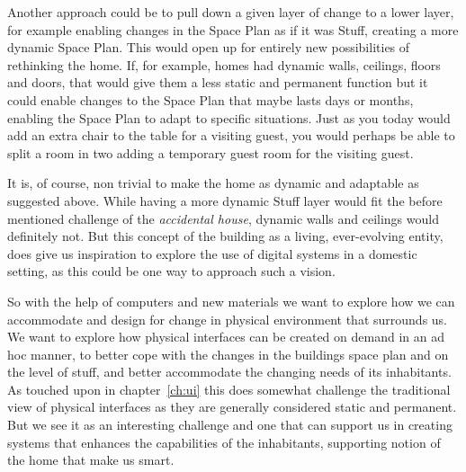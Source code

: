 Another approach could be to pull down a given layer of change to a lower layer, for example enabling changes in the Space Plan as if it was Stuff, creating a more dynamic Space Plan.
This would open up for entirely new possibilities of rethinking the home. 
If, for example, homes had dynamic walls, ceilings, floors and doors, that would give them a less static and permanent function but it could enable changes to the Space Plan that maybe lasts days or months, enabling the Space Plan to adapt to specific situations.
Just as you today would add an extra chair to the table for a visiting guest, you would perhaps be able to split a room in two adding a temporary guest room for the visiting guest.

It is, of course, non trivial to make the home as dynamic and adaptable as suggested above.
While having a more dynamic Stuff layer would fit the before mentioned challenge of the \emph{accidental house}, dynamic walls and ceilings would definitely not. 
But this concept of the building as a living, ever-evolving entity, does give us inspiration to explore the use of digital systems in a domestic setting, as this could be one way to approach such a vision.

So with the help of computers and new materials we want to explore how we can accommodate and design for change in physical environment that surrounds us.
We want to explore how physical interfaces can be created on demand in an ad hoc manner, to better cope with the changes in the buildings space plan and on the level of stuff, and better accommodate the changing needs of its inhabitants.
As touched upon in chapter~\ref{ch:ui} this does somewhat challenge the traditional view of physical interfaces as they are generally considered static and permanent.
But we see it as an interesting challenge and one that can support us in creating systems that enhances the capabilities of the inhabitants, supporting \citet{taylor2007homes} notion of the home that make us smart.